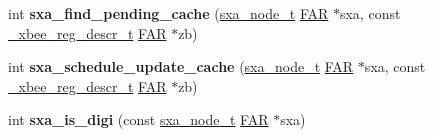 \begin{DoxyCompactItemize}
\item 
\hypertarget{group___s_x_a_ga77e16624f969e20d1c39a468d783a5ea}{int {\bfseries sxa\-\_\-find\-\_\-pending\-\_\-cache} (\hyperlink{structsxa__node__t}{sxa\-\_\-node\-\_\-t} \hyperlink{group__hal_gaef060b3456fdcc093a7210a762d5f2ed}{F\-A\-R} $\ast$sxa, const \hyperlink{struct__xbee__reg__descr__t}{\-\_\-xbee\-\_\-reg\-\_\-descr\-\_\-t} \hyperlink{group__hal_gaef060b3456fdcc093a7210a762d5f2ed}{F\-A\-R} $\ast$zb)}\label{group___s_x_a_ga77e16624f969e20d1c39a468d783a5ea}

\item 
\hypertarget{group___s_x_a_gaa85363be4aaec395e0702bffe9fd737a}{int {\bfseries sxa\-\_\-schedule\-\_\-update\-\_\-cache} (\hyperlink{structsxa__node__t}{sxa\-\_\-node\-\_\-t} \hyperlink{group__hal_gaef060b3456fdcc093a7210a762d5f2ed}{F\-A\-R} $\ast$sxa, const \hyperlink{struct__xbee__reg__descr__t}{\-\_\-xbee\-\_\-reg\-\_\-descr\-\_\-t} \hyperlink{group__hal_gaef060b3456fdcc093a7210a762d5f2ed}{F\-A\-R} $\ast$zb)}\label{group___s_x_a_gaa85363be4aaec395e0702bffe9fd737a}

\item 
\hypertarget{group___s_x_a_ga4e69849f1bd4c5261fd1185506a96b01}{int {\bfseries sxa\-\_\-is\-\_\-digi} (const \hyperlink{structsxa__node__t}{sxa\-\_\-node\-\_\-t} \hyperlink{group__hal_gaef060b3456fdcc093a7210a762d5f2ed}{F\-A\-R} $\ast$sxa)}\label{group___s_x_a_ga4e69849f1bd4c5261fd1185506a96b01}

\end{DoxyCompactItemize}
